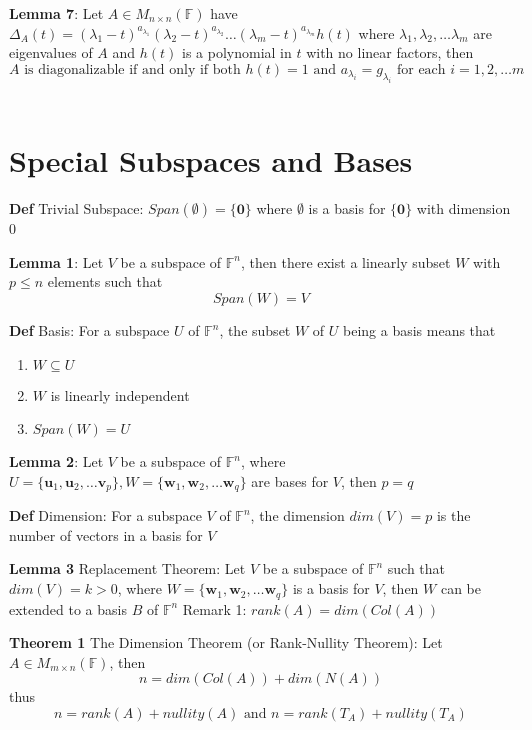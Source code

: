 \documentclass[11pt,notitlepage]{report}
\newcommand{\bb}[1]{\ensuremath{\mathbb{#1}}}
\newcommand{\tbf}[1]{\textbf{#1}}
\begin{document}
\textbf{Lemma 7}: Let $A \in M_{n \times n}(\bb F)$ have $\Delta_A(t) = (\lambda_1 - t)^{a_{\lambda_1}}(\lambda_2 - t)^{a_{\lambda_2}}\dots(\lambda_m - t)^{a_{\lambda_m}}h(t)$ where $\lambda_1, \lambda_2, \dots \lambda_m$ are eigenvalues of $A$ and $h(t)$ is a polynomial in $t$ with no linear factors, then
$$A \text{ is diagonalizable if and only if both } h(t) =1 \text{ and } a_{\lambda_i} = g_{\lambda_i} \text{ for each } i = 1,2, \dots m$$\\


\section{Special Subspaces and Bases}

\textbf{Def} Trivial Subspace: $Span(\emptyset) = \{\tbf 0\}$ where $\emptyset$ is a basis for $\{ \tbf 0 \}$ with dimension 0

\textbf{Lemma 1}: Let $V$ be a subspace of $\bb F^n$, then there exist a linearly subset $W$ with $p \leq n$ elements such that
$$Span(W) = V$$

\textbf{Def} Basis: For a subspace $U$ of $\bb F^n$, the subset $W$ of $U$ being a basis means that
\begin{enumerate}
    \item $W \subseteq U$
    \item $W$ is linearly independent
    \item $Span(W) = U$
\end{enumerate}

\textbf{Lemma 2}: Let $V$ be a subspace of $\bb F^n$, where $U = \{\tbf u_1, \tbf u_2, \dots \tbf v_p\}, W = \{\tbf w_1, \tbf w_2, \dots \tbf w_q\}$ are bases for $V$, then $p = q$

\textbf{Def} Dimension: For a subspace $V$ of $\bb F^n$, the dimension $dim(V) = p$ is the number of vectors in a basis for $V$

\textbf{Lemma 3} Replacement Theorem: Let $V$ be a subspace of $\bb F^n$ such that $dim(V) = k > 0$, where $W = \{\tbf w_1, \tbf w_2, \dots \tbf w_q\}$ is a basis for $V$, then $W$ can be extended to a basis $B$ of $\bb F^n$
\hspace*{5mm} Remark 1: $rank(A) = dim(Col(A))$

\textbf{Theorem 1} The Dimension Theorem (or Rank-Nullity Theorem): Let $A \in M_{m \times n}(\bb F)$, then
$$n = dim(Col(A)) + dim(N(A))$$
thus
$$n = rank(A) + nullity(A) \text{ and } n = rank(T_A) + nullity(T_A)$$

\newpage
\end{document}
